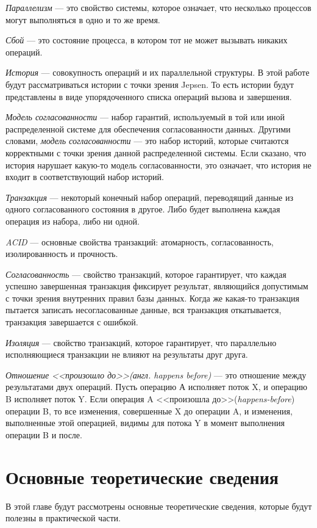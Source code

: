 \documentclass[14pt,  openany]{book}
\begin{document}
\emph{Параллелизм} --- это свойство системы, которое означает, что несколько процессов могут выполняться в одно и то же время.

\emph{Сбой} --- это состояние процесса, в котором тот не может вызывать никаких операций. 

\emph{История} --- совокупность операций и их параллельной структуры. В этой работе будут рассматриваться истории с точки зрения Jepsen. То есть истории будут представлены в виде упорядоченного списка операций вызова и завершения.

\emph{Модель согласованности} --- набор гарантий, используемый в той или иной распределенной системе для обеспечения согласованности данных.  Другими словами,  \textit{модель согласованности} --- это набор историй, которые считаются корректными с точки зрения данной распределенной системы.  Если сказано, что история нарушает какую-то модель согласованности, это означает, что история не входит в соответствующий набор историй. \cite{jepsenConsistencyModels}

\emph{Транзакция} --- некоторый конечный набор операций, переводящий данные из одного согласованного состояния в другое. Либо будет выполнена каждая операция из набора, либо ни одной.

\emph{ACID} --- основные свойства транзакций: атомарность, согласованность, изолированность и прочность.

\emph{Согласованность} --- свойство транзакций, которое гарантирует, что каждая успешно завершенная транзакция фиксирует результат, являющийся допустимым с точки зрения внутренних правил базы данных. Когда же какая-то транзакция пытается записать несогласованные данные, вся транзакция откатывается, транзакция завершается с ошибкой.

\emph{Изоляция} --- свойство транзакций, которое гарантирует, что параллельно исполняющиеся транзакции не влияют на результаты друг друга. 

\emph{Отношение <<произошло до>>(англ. \textit{happens before})} --- \cite{habrMemoryModel} это отношение между результатами двух операций.  Пусть операцию А исполняет поток X, и операцию B исполняет поток Y. Если операция A <<произошла до>>(\textit{happens-before}) операции B, то все изменения, совершенные X до операции A, и изменения, выполненные этой операцией, видимы для потока Y в момент выполнения операции B и после.  

\chapter{Основные теоретические сведения}
В этой главе будут рассмотрены основные теоретические сведения, которые будут полезны в практической части.
\end{document}
